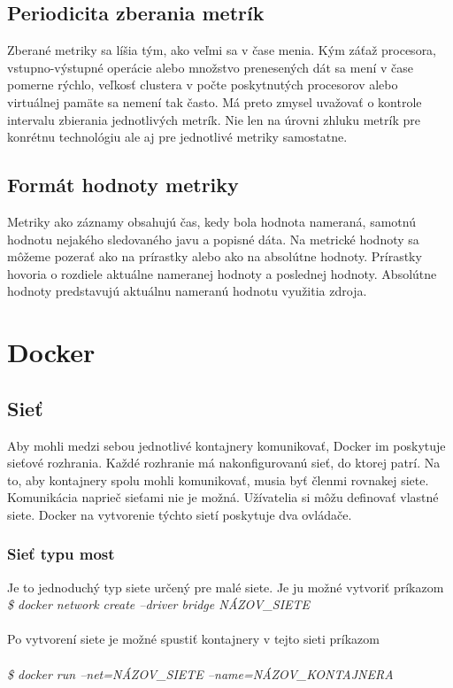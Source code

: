 \documentclass[11pt,final,oneside]{fithesis}
\begin{document}
\subsection{Periodicita zberania metrík}
Zberané metriky sa líšia tým, ako veľmi sa v čase menia. Kým záťaž procesora, vstupno-výstupné operácie alebo množstvo prenesených dát sa mení v čase pomerne rýchlo, veľkosť clustera v počte poskytnutých procesorov 
alebo virtuálnej pamäte sa nemení tak často. Má preto zmysel uvažovať o kontrole intervalu zbierania jednotlivých metrík. Nie len na úrovni zhluku metrík pre konrétnu technológiu ale aj pre jednotlivé metriky samostatne.

\subsection{Formát hodnoty metriky}
Metriky ako záznamy obsahujú čas, kedy bola hodnota nameraná, samotnú hodnotu nejakého sledovaného javu a popisné dáta. Na metrické
hodnoty sa môžeme pozerať ako na prírastky alebo ako na absolútne hodnoty. Prírastky hovoria o rozdiele aktuálne nameranej hodnoty 
a poslednej hodnoty. Absolútne hodnoty predstavujú aktuálnu nameranú hodnotu využitia zdroja. 

\section{Docker}
\subsection{Sieť}
Aby mohli medzi sebou jednotlivé kontajnery komunikovať, Docker im poskytuje sieťové rozhrania. Každé rozhranie má nakonfigurovanú sieť,
do ktorej patrí. Na to, aby kontajnery spolu mohli komunikovať, musia byť členmi rovnakej siete. Komunikácia naprieč sieťami nie je možná.
Užívatelia si môžu definovať vlastné siete. Docker na vytvorenie týchto sietí poskytuje dva ovládače.

\subsubsection{Sieť typu most}
Je to jednoduchý typ siete určený pre malé siete. Je ju možné vytvoriť príkazom 
\\
{\em \$ docker network create --driver bridge NÁZOV\_SIETE}
\\ \\
Po vytvorení siete je možné spustiť kontajnery v tejto sieti príkazom
\\ \\
{\em \$ docker run --net=NÁZOV\_SIETE --name=NÁZOV\_KONTAJNERA}
\end{document}
